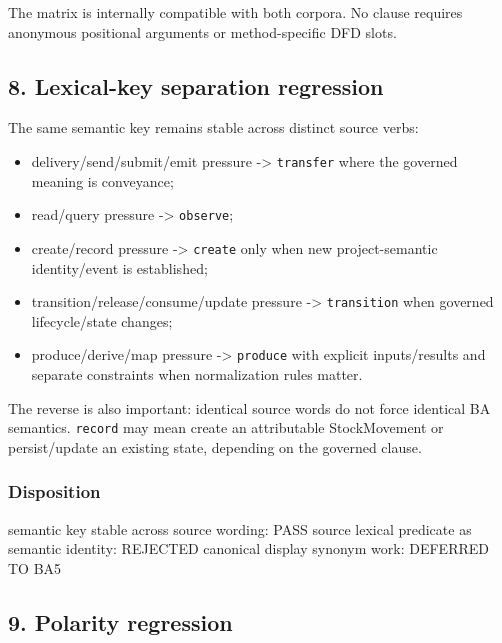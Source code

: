 \documentclass[
  10pt,
  a4paper,
]{article}
\newenvironment{Shaded}{}{}
\newcommand{\NormalTok}[1]{#1}
\providecommand{\tightlist}{%
  \setlength{\itemsep}{0pt}\setlength{\parskip}{0pt}}
\begin{document}
The matrix is internally compatible with both corpora. No clause
requires anonymous positional arguments or method-specific DFD slots.

\subsection{8. Lexical-key separation
regression}\label{8-lexical-key-separation-regression}

The same semantic key remains stable across distinct source verbs:

\begin{itemize}
\tightlist
\item
  delivery/send/submit/emit pressure -\textgreater{} \texttt{transfer}
  where the governed meaning is conveyance;
\item
  read/query pressure -\textgreater{} \texttt{observe};
\item
  create/record pressure -\textgreater{} \texttt{create} only when new
  project-semantic identity/event is established;
\item
  transition/release/consume/update pressure -\textgreater{}
  \texttt{transition} when governed lifecycle/state changes;
\item
  produce/derive/map pressure -\textgreater{} \texttt{produce} with
  explicit inputs/results and separate constraints when normalization
  rules matter.
\end{itemize}

The reverse is also important: identical source words do not force
identical BA semantics. \texttt{record} may mean create an attributable
StockMovement or persist/update an existing state, depending on the
governed clause.

\subsubsection{Disposition}\label{disposition}

\begin{Shaded}
\begin{Highlighting}[]
\NormalTok{semantic key stable across source wording: PASS}
\NormalTok{source lexical predicate as semantic identity: REJECTED}
\NormalTok{canonical display synonym work: DEFERRED TO BA5}
\end{Highlighting}
\end{Shaded}

\subsection{9. Polarity regression}\label{9-polarity-regression}
\end{document}

